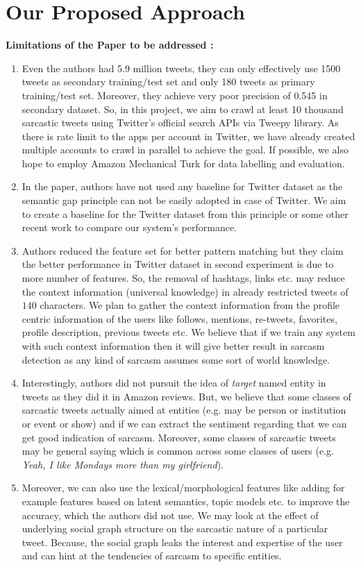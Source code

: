 \section{Our Proposed Approach}
\label{sec:evaluation}
\noindent \textbf{Limitations of the Paper to be addressed :}
\begin{enumerate}
 \item Even the authors had 5.9 million tweets, they can only effectively use 1500 tweets as secondary training/test set and only 180 tweets as primary training/test set. Moreover, they achieve very poor precision of 0.545 in secondary dataset. So, in this project, we aim to crawl at least 10 thousand sarcastic tweets using Twitter's official search APIs via Tweepy \cite{tweepy} library. As there is rate limit to the apps per account in Twitter, we have already created multiple accounts to crawl in parallel to achieve the goal. If possible, we also hope to employ Amazon Mechanical Turk for data labelling and evaluation.
 \item In the paper, authors have not used any baseline for Twitter dataset as the semantic gap principle can not be easily adopted in case of Twitter. We aim to create a baseline for the Twitter dataset from this principle or some other recent work to compare our system's performance.
 \item Authors reduced the feature set for better pattern matching but they claim the better performance in Twitter dataset in second experiment is due to more number of features. So, the removal of hashtags, links etc. may reduce the context information (universal knowledge) in already restricted tweets of $140$ characters. We plan to gather the context information from the profile centric information of the users like follows, mentions, re-tweets, favorites, profile description, previous tweets etc. We believe that if we train any system with such context information then it will give better result in sarcasm detection as any kind of sarcasm assumes some sort of world knowledge.
 \item Interestingly, authors did not pursuit the idea of \textit{target} named entity in tweets as they did it in Amazon reviews. But, we believe that some classes of sarcastic tweets actually aimed at entities (e.g. may be person or institution or event or show) and if we can extract the sentiment regarding that we can get good indication of sarcasm. Moreover, some classes of sarcastic tweets may be general saying which is common across some classes of users (e.g. \textit{Yeah, I like Mondays more than my girlfriend}).
 \item Moreover, we can also use the lexical/morphological features like adding for example features based on latent semantics, topic models etc. to improve the accuracy, which the authors did not use. We may look at the effect of underlying social graph structure on the sarcastic nature of a particular tweet. Because, the social graph leaks the interest and expertise of the user and can hint at the tendencies of sarcasm to specific entities.\\
\end{enumerate}

